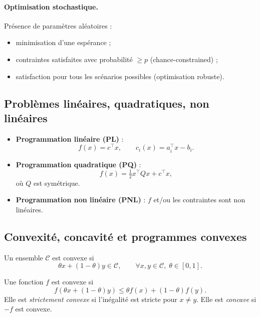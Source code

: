 \paragraph{Optimisation stochastique.}
Présence de paramètres aléatoires :
\begin{itemize}
  \item minimisation d’une espérance ;
  \item contraintes satisfaites avec probabilité $\ge p$ (chance-constrained) ;
  \item satisfaction pour tous les scénarios possibles (optimisation robuste).
\end{itemize}

\subsection{Problèmes linéaires, quadratiques, non linéaires}

\begin{itemize}
  \item \textbf{Programmation linéaire (PL)} :
  \[
  f(x)=c^\top x,\qquad c_i(x)=a_i^\top x - b_i.
  \]

  \item \textbf{Programmation quadratique (PQ)} :
  \[
  f(x)=\tfrac12 x^\top Q x + c^\top x,
  \]
  où $Q$ est symétrique.

  \item \textbf{Programmation non linéaire (PNL)} :
  $f$ et/ou les contraintes sont non linéaires.
\end{itemize}

\subsection{Convexité, concavité et programmes convexes}

\begin{definition}
Un ensemble $\mathcal{C}$ est convexe si  
\[
\theta x + (1-\theta)y \in \mathcal{C},\qquad \forall x,y\in\mathcal{C},\;\theta\in[0,1].
\]
\end{definition}

\begin{definition}
Une fonction $f$ est convexe si  
\[
f(\theta x + (1-\theta)y)\le \theta f(x)+(1-\theta)f(y).
\]
Elle est \emph{strictement convexe} si l’inégalité est stricte pour $x\neq y$.
Elle est \emph{concave} si $-f$ est convexe.
\end{definition}

